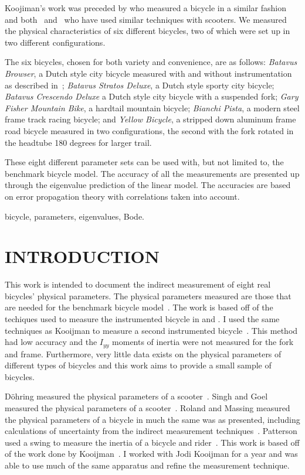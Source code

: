 \documentclass{bmd2010p}
\begin{document}
Koojiman's work was preceded by \cite{Roland1971} who measured a bicycle in a
similar fashion and both~\cite{Dohring1953} and~\cite{Singh1971} who have used
similar techniques with scooters. We measured the physical characteristics of six
different bicycles, two of which were set up in two different configurations.

The six bicycles, chosen for both variety and convenience, are as follows:
\emph{Batavus Browser}, a Dutch style city bicycle measured with and without
instrumentation as described in~\cite{Kooijman2009a}; \emph{Batavus Stratos
Deluxe}, a Dutch style sporty city bicycle; \emph{Batavus Crescendo Deluxe} a
Dutch style city bicycle with a suspended fork; \emph{Gary Fisher Mountain
Bike}, a hardtail mountain bicycle; \emph{Bianchi Pista}, a modern steel frame
track racing bicycle; and \emph{Yellow Bicycle}, a stripped down aluminum frame
road bicycle measured in two configurations, the second with the fork rotated
in the headtube 180 degrees for larger trail.

These eight different parameter sets can be used with, but not
limited to, the benchmark bicycle model. The accuracy of all the measurements
are presented up through the eigenvalue prediction of the linear model. The
accuracies are based on error propagation theory with correlations taken into account.
\begin{keywords}
bicycle,
parameters,
eigenvalues,
Bode.
\end{keywords}

\section{INTRODUCTION}

This work is intended to document the indirect measurement of eight real
bicycles' physical parameters. The physical parameters measured are those that
are needed for the benchmark bicycle model~\cite{Meijaard2007}. The work is
based off of the techiques used to measure the instrumented bicycle in
\cite{Kooijman2006} and \cite{Kooijman2008}. I used the same techniques as
Kooijman to measure a second instrumented bicycle~\cite{Moore2009a}. This
method had low accuracy and the $I_{yy}$ moments of inertia were
not measured for the fork and frame. Furthermore, very little data exists on
the physical parameters of different types of bicycles and this work aims to
provide a small sample of bicycles.

D\"{o}hring measured the physical parameters of a scooter~\cite{Dohring1953}.
Singh and Goel measured the physical parameters of a scooter~\cite{Singh1971}.
Roland and Massing measured the physical parameters of a bicycle in much the
same was as presented, including calculations of uncertainty from the indirect
measurement techniques~\cite{Roland1971}. Patterson used a swing to measure the
inertia of a bicycle and rider~\cite{Patterson2004}. This work is based off of the work
done by Kooijman~\cite{Kooijman2006}. I worked with Jodi Kooijman for a year and
was able to use much of the same apparatus and refine the measurement
technique.
\end{document}
